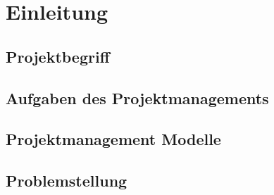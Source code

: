 
\chapter{Einleitung}


\section{Projektbegriff}


\section{Aufgaben des Projektmanagements}


\section{Projektmanagement Modelle}


\section{Problemstellung}